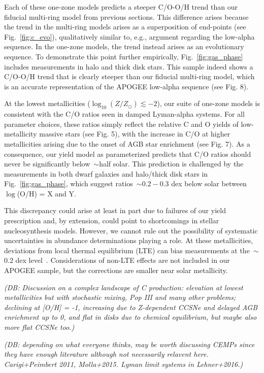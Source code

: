 \documentclass[fleqn,
usenatbib]{mnras}
\makeatletter
\DeclareRobustCommand\citepos
  {\begingroup
   \let\NAT@nmfmt\NAT@posfmt%
   \NAT@swafalse\let\NAT@ctype\z@\NAT@partrue
   \@ifstar{\NAT@fulltrue\NAT@citetp}{\NAT@fullfalse\NAT@citetp}}
\let\NAT@orig@nmfmt\NAT@nmfmt
\def\NAT@posfmt#1{\NAT@orig@nmfmt{#1's}}
\newcommand{\dbnote}[1]{ {\color{Thistle} \textit{\small (DB: #1)}} }
\makeatother
\begin{document}
Each of these one-zone models predicts a steeper C/O-O/H trend than our
fiducial multi-ring model from previous sections.
This difference arises because the trend in the multi-ring models arises as a
superposition of end-points (see Fig.~\ref{fig:c_evo}), qualitatively similar to, e.g.,
\citepos{schonrich-binney09} argument regarding
the low-alpha sequence.
In the one-zone models, the trend instead arises as an evolutionary sequence.
To demonstrate this point further empirically, Fig.~\ref{fig:gas_phase} includes measurements
in halo and thick disk stars.
This sample indeed shows a C/O-O/H trend that is clearly steeper than our
fiducial multi-ring model, which is an accurate representation of the APOGEE
low-alpha sequence (see Fig. 8).

At the lowest metallicities ($\log_{10}(Z / Z_\odot) \lesssim -2$), our suite
of one-zone models is consistent with the C/O ratios seen in damped Lyman-alpha
systems.
For all parameter choices, these ratios simply reflect the relative C and O
yields of low-metallicity massive stars (see Fig. 5), with the increase in C/O
at higher metallicities arising due to the onset of AGB star enrichment (see
Fig. 7).
As a consequence, our yield model as parameterized predicts that C/O ratios
should never be significantly below~$\sim$half solar.
This prediction is challenged by the measurements in both dwarf galaxies and
halo/thick disk stars in Fig.~\ref{fig:gas_phase}, which suggest ratios~$\sim$$0.2 - 0.3$ dex
below solar between~$\log$(O/H) = X and Y.

This discrepancy could arise at least in part due to failures of our yield
prescription and, by extension, could point to shortcomings in stellar
nucleosynthesis models.
However, we cannot rule out the possibility of systematic uncertainties in
abundance determinations playing a role.
At these metallicities, deviations from local thermal equilibrium (LTE) can
bias measurements at the~$\sim$0.2 dex level~\citep[e.g.,][]{amarsi+19}.
Considerations of non-LTE effects are not included in our APOGEE sample, but
the corrections are smaller near solar metallicity.

\dbnote{Discussion on a complex landscape of C production: elevation at lowest metallicities but with stochastic mixing, Pop III and many other problems; declining at [O/H] = -1, increasing due to Z-dependent CCSNe and delayed AGB enrichment up to 0, and flat in disks due to chemical equilibrium, but maybe also more flat CCSNe too.}


\dbnote{depending on what everyone thinks, may be worth discussing CEMPs since they have enough literature although not necessarily relavent here. Carigi+Peimbert 2011, Molla+2015. Lyman limit systems in Lehner+2016.}
\end{document}
